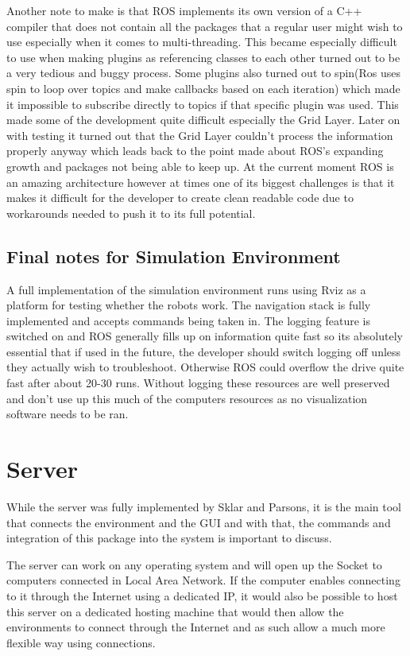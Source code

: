       Another note to make is that ROS implements its own version of a C++ compiler that does not contain all the packages that a regular user might wish to use especially when it comes to multi-threading. This became especially difficult to use when making plugins as referencing classes to each other turned out to be a very tedious and buggy process. Some plugins also turned out to spin(Ros uses spin to loop over topics and make callbacks based on each iteration) which made it impossible to subscribe directly to topics if that specific plugin was used. This made some of the development quite difficult especially the Grid Layer. Later on with testing it turned out that the Grid Layer couldn't process the information properly anyway which leads back to the point made about ROS's expanding growth and packages not being able to keep up. At the current moment ROS is an amazing architecture however at times one of its biggest challenges is that it makes it difficult for the developer to create clean readable code due to workarounds needed to push it to its full potential.

    \subsection{Final notes for Simulation Environment}
      A full implementation of the simulation environment runs using Rviz as a platform for testing whether the robots work. The navigation stack is fully implemented and accepts commands being taken in. The logging feature is switched on and ROS generally fills up on information quite fast so its absolutely essential that if used in the future, the developer should switch logging off unless they actually wish to troubleshoot. Otherwise ROS could overflow the drive quite fast after about 20-30 runs. Without logging these resources are well preserved and don't use up this much of the computers resources as no visualization software needs to be ran.

  \section{Server}
    While the server was fully implemented by  Sklar and Parsons\cite{technical}, it is the main tool that connects the environment and the GUI and with that, the commands and integration of this package into the system is important to discuss.

    The server can work on any operating system and will open up the Socket to computers connected in Local Area Network. If the computer enables connecting to it through the Internet using a dedicated IP, it would also be possible to host this server on a dedicated hosting machine that would then allow the environments to connect through the Internet and as such allow a much more flexible way using connections.

